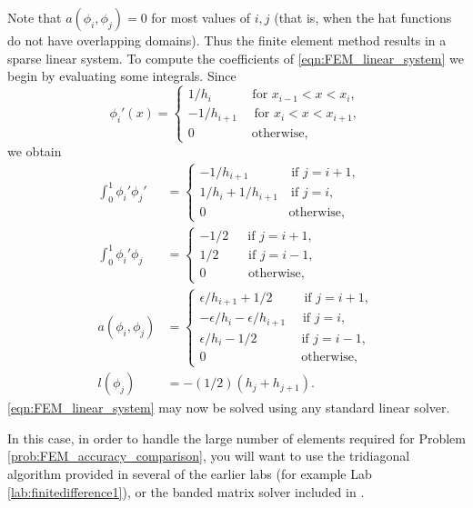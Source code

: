 Note that $a(\phi_i,\phi_j) = 0$ for most values of $i, j$ (that is, when the hat functions do not have overlapping domains).
Thus the finite element method results in a sparse linear system.
To compute the coefficients of \eqref{eqn:FEM_linear_system} we begin by evaluating some integrals.
Since
\[\phi_i'(x) = \begin{cases}
1/h_i \quad \quad \quad \, \text{for } x_{i-1} < x < x_i,\\
 -1/h_{i+1} \quad \text{ for } x_{i} < x < x_{i+1},\\
0 \quad \quad \quad \quad \, \text{ otherwise},
\end{cases}\]
we obtain
\begin{align*}
\int_0^1  \phi_i'\phi_j' &= \begin{cases}
- 1/h_{i+1} \quad \quad \quad \text{ if } j=i+1,\\
1/h_i + 1/h_{i+1} \quad \text{if } j=i,\\
0 \quad \quad \quad \quad \quad \quad \, \text{ otherwise},
\end{cases} \\
\int_0^1  \phi_i'\phi_j &= \begin{cases}
- 1/2 \quad \,\text{ if } j=i+1,\\
1/2 \quad \quad \text{ if } j=i-1,\\
0 \quad \quad \quad \text{ otherwise},
\end{cases} \\
a(\phi_i,\phi_j) &= \begin{cases}
\epsilon/h_{i+1} + 1/2 \quad \quad \, \text{ if } j=i+1,\\
-\epsilon/h_i -\epsilon/h_{i+1} \quad  \text{ if } j=i,\\
\epsilon/h_i - 1/2 \quad \quad \quad \, \text{ if } j=i-1,\\
0 \quad \quad \quad \quad \quad \quad \,\,\,\,\,\,\, \text{ otherwise},
\end{cases}\\
l(\phi_j) &= -(1/2)(h_j + h_{j+1}).
\end{align*}
\eqref{eqn:FEM_linear_system} may now be solved using any standard linear solver.

In this case, in order to handle the large number of elements required for Problem \ref{prob:FEM_accuracy_comparison}, you will want to use the tridiagonal algorithm provided in several of the earlier labs (for example Lab \ref{lab:finitedifference1}), or the banded matrix solver included in .

